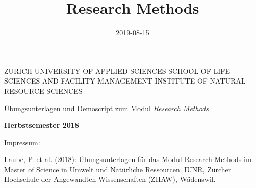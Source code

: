 \documentclass[]{book}
\title{Research Methods}
\author{}
\date{2019-08-15}
\begin{document}
\maketitle


\begin{titlepage}
\begin{center}
  
{\small 
ZURICH UNIVERSITY OF APPLIED SCIENCES
\linebreak SCHOOL OF LIFE SCIENCES AND FACILITY MANAGEMENT
\linebreak INSTITUTE OF NATURAL RESOURCE SCIENCES
}

\end{center}
\vspace{1.5cm}
\begin{center}

{\Large Übungsunterlagen und Demoscript zum Modul \emph{Research Methods}}

\end{center}
 \vspace{1cm}


\begin{center}
\textbf{Herbstsemester 2018}


\end{center} 

\vspace{1.0cm}


\newpage
\thispagestyle{empty}
\begin{minipage}{15cm}
\begin{flushleft}




\vspace{18cm}
{\large Impressum:}

\vspace{0.5cm}

Laube, P. et al. (2018): Übungsunterlagen für das Modul Research Methods im Master of Science in Umwelt und Natürliche Ressourcen. IUNR, Zürcher Hochschule der Angewandten Wissenschaften (ZHAW), W{\"a}denswil.

\end{flushleft}
\end{minipage}

\end{titlepage}
\restoregeometry
\end{document}
